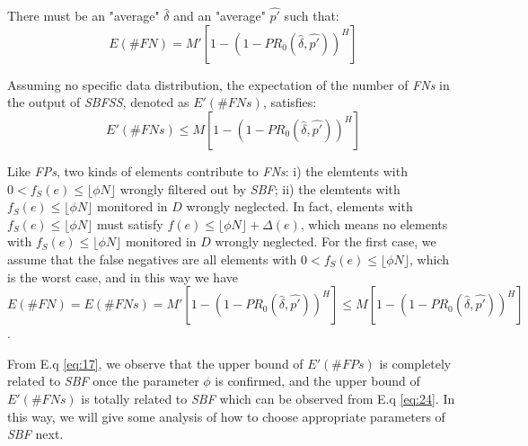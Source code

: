 \documentclass[conference]{IEEEtran}
\begin{document}
\begin{lemma}\label{lem:9}
There must be an "average" $\widehat{\delta}$ and an "average" $\widehat{p'}$ such that: 
\begin{equation}\label{eq:20}
E(\#FN)=M'[1-(1-PR_0(\widehat{\delta},\widehat{p'}))^H]
\end{equation}
\end{lemma}

\begin{theorem}\label{thm:7}
	Assuming no specific data distribution, the expectation of the number of \emph{FNs} in the output of \emph{SBFSS}, denoted as $E'(\#FNs)$, satisfies:
	\begin{equation}\label{eq:24}
	E'(\#FNs)\leq M[1-(1-PR_0(\widehat{\delta},\widehat{p'}))^H]
	\end{equation}
\end{theorem}

\begin{IEEEproof}
Like \emph{FPs}, two kinds of elements contribute to \emph{FNs}: i) the elemtents with $0<f_S(e)\leq\lfloor \phi N\rfloor$ wrongly filtered out by \emph{SBF}; ii) the elemtents with $f_S(e)\leq\lfloor \phi N\rfloor$ monitored in $D$ wrongly neglected. In fact, elements with $f_S(e)\leq\lfloor \phi N\rfloor$ must satisfy $f(e)\leq\lfloor \phi N\rfloor+\Delta(e)$, which means no elements with $f_S(e)\leq\lfloor \phi N\rfloor$ monitored in $D$ wrongly neglected. For the first case, we assume that the false negatives are all elements with $0<f_S(e)\leq\lfloor \phi N\rfloor$, which is the worst case, and in this way we have $E(\#FN)=E(\#FNs)=M'[1-(1-PR_0(\widehat{\delta},\widehat{p'}))^H]\leq M[1-(1-PR_0(\widehat{\delta},\widehat{p'}))^H]$.
\end{IEEEproof}
From E.q \ref{eq:17}, we observe that the upper bound of $E'(\#FPs)$ is completely related to \emph{SBF} once the parameter $\phi$ is confirmed, and the upper bound of $E'(\#FNs)$ is totally related to \emph{SBF} which can be observed from E.q \ref{eq:24}. In this way, we will give some analysis of how to choose appropriate parameters of \emph{SBF} next.
\end{document}
